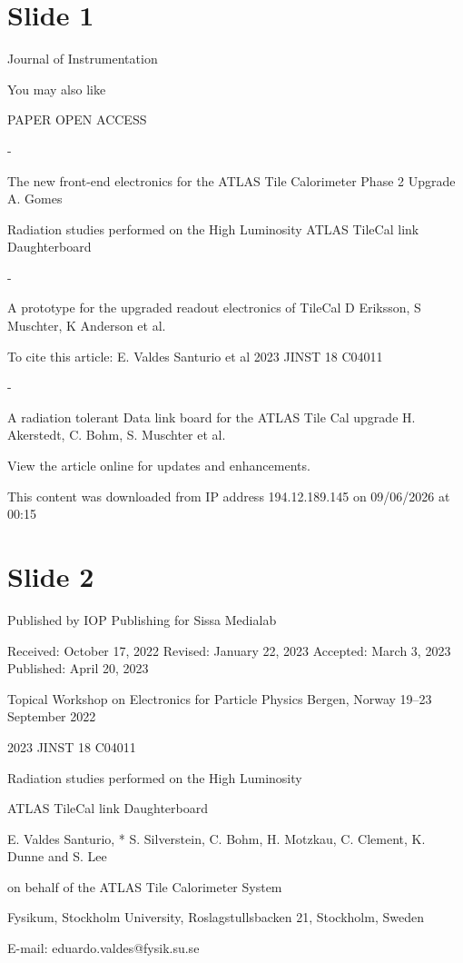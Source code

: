 \documentclass{article}
\begin{document}
\section*{Slide 1}

Journal of 
Instrumentation

You may also like

PAPER   OPEN ACCESS

-

The new front-end electronics for the 
ATLAS Tile Calorimeter Phase 2 Upgrade 
A. Gomes

Radiation studies performed on the High 
Luminosity ATLAS TileCal link Daughterboard

-

A prototype for the upgraded readout 
electronics of TileCal 
D Eriksson, S Muschter, K Anderson et al.

To cite this article: E. Valdes Santurio et al 2023 JINST 18 C04011

-

A radiation tolerant Data link board for the 
ATLAS Tile Cal upgrade 
H. Akerstedt, C. Bohm, S. Muschter et al.

View the  article online  for updates and enhancements.

This content was downloaded from IP address 194.12.189.145 on 09/06/2026 at 00:15

\section*{Slide 2}

Published by IOP Publishing for Sissa Medialab

Received:   October 17, 2022 
Revised:   January 22, 2023 
Accepted:   March 3, 2023 
Published:   April 20, 2023

Topical Workshop on Electronics for Particle Physics 
Bergen, Norway 
19--23 September 2022

2023 JINST 18 C04011

Radiation studies performed on the High Luminosity

ATLAS TileCal link Daughterboard

E. Valdes Santurio, * S. Silverstein,   C. Bohm,   H. Motzkau,   C. Clement,   K. Dunne   and S. Lee

on behalf of the ATLAS Tile Calorimeter System

Fysikum, Stockholm University, 
Roslagstullsbacken 21, Stockholm, Sweden

E-mail:  eduardo.valdes@fysik.su.se
\end{document}
